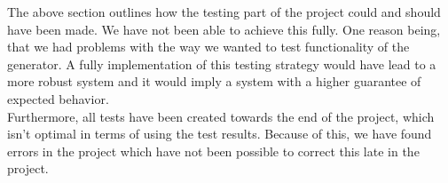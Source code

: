 \documentclass[paper=a4, fontsize=11pt]{scrartcl} %
\numberwithin{equation}{section} %
\numberwithin{figure}{section} %
\numberwithin{table}{section} %
\begin{document}
The above section outlines how the testing part of the project could and should have been made. We have not been able to achieve this fully. One reason being, that we had problems with the way we wanted to test functionality of the generator. A fully implementation of this testing strategy would have lead to a more robust system and it would imply a system with a higher guarantee of expected behavior. \\
Furthermore, all tests have been created towards the end of the project, which isn't optimal in terms of using the test results. Because of this, we have found errors in the project which have not been possible to correct this late in the project.

\end{document}
